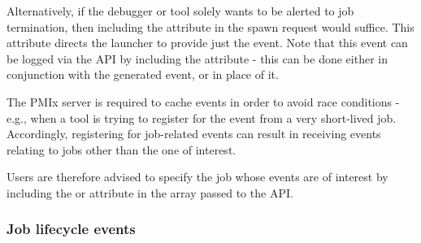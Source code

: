 Alternatively, if the debugger or tool solely wants to be alerted to job
termination, then including the  attribute in
the spawn request would suffice. This attribute directs the launcher to provide
just the  event. Note that this event can be
logged via the  \ac{API} by including the
 attribute - this can be done either in
conjunction with the generated event, or in place of it.

\adviceuserstart
The \ac{PMIx} server is required to cache events in order to avoid race
conditions - e.g., when a tool is trying to register for the
 event from a very short-lived job. Accordingly,
registering for job-related events can result in receiving events relating to
jobs other than the one of interest.

Users are therefore advised to specify the job whose events are of interest by
including the  or
 attribute in the  array passed
to the  \ac{API}.

\adviceuserend

\subsubsection{Job lifecycle events}

